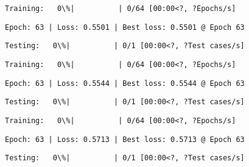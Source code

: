 \documentclass[11pt]{article}
\begin{document}
    
    
    \begin{Verbatim}[commandchars=\\\{\}]
Training:   0\%|          | 0/64 [00:00<?, ?Epochs/s]
    \end{Verbatim}

    
    \begin{Verbatim}[commandchars=\\\{\}]
Epoch: 63 | Loss: 0.5501 | Best loss: 0.5501 @ Epoch 63
    \end{Verbatim}

    
    \begin{Verbatim}[commandchars=\\\{\}]
Testing:   0\%|          | 0/1 [00:00<?, ?Test cases/s]
    \end{Verbatim}

    
    
    \begin{Verbatim}[commandchars=\\\{\}]
Training:   0\%|          | 0/64 [00:00<?, ?Epochs/s]
    \end{Verbatim}

    
    \begin{Verbatim}[commandchars=\\\{\}]
Epoch: 63 | Loss: 0.5544 | Best loss: 0.5544 @ Epoch 63
    \end{Verbatim}

    
    \begin{Verbatim}[commandchars=\\\{\}]
Testing:   0\%|          | 0/1 [00:00<?, ?Test cases/s]
    \end{Verbatim}

    
    
    \begin{Verbatim}[commandchars=\\\{\}]
Training:   0\%|          | 0/64 [00:00<?, ?Epochs/s]
    \end{Verbatim}

    
    \begin{Verbatim}[commandchars=\\\{\}]
Epoch: 63 | Loss: 0.5713 | Best loss: 0.5713 @ Epoch 63
    \end{Verbatim}

    
    \begin{Verbatim}[commandchars=\\\{\}]
Testing:   0\%|          | 0/1 [00:00<?, ?Test cases/s]
    \end{Verbatim}
\end{document}
